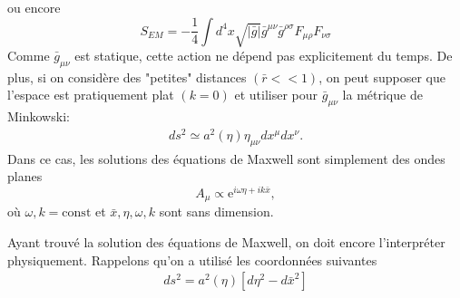\documentclass[a4paper,12pt]{report}
\theoremstyle{plain}
\theoremstyle{plain}
\begin{document}
   ou encore 
   \begin{equation}
   S_{EM} = - \frac{1}{4} \displaystyle \int d^4x \sqrt{|\bar{g}|} \bar{g}^{\mu \nu } \bar{g}^{\rho \sigma } F_{\mu \rho } F_{\nu \sigma } 
   \end{equation}
   Comme $\bar{g}_{\mu \nu }$ est statique, cette action ne d\'epend pas explicitement du temps. De plus, si on consid\`ere des "petites" distances $(\bar{r}<<1)$, on peut supposer que l'espace est pratiquement plat $(k=0)$ et utiliser pour $\bar{g}_{\mu \nu }$ la m\'etrique de Minkowski: 
   \begin{eqnarray}
   ds^2 \simeq a^2 ( \eta) \eta_{\mu \nu } dx^\mu dx^\nu.
   \end{eqnarray}
   Dans ce cas, les solutions des \'equations de Maxwell sont simplement des ondes planes 
   \begin{equation}
   A_\mu \propto \mathrm{e}^{i \omega \eta +ik \bar{x}},
   \end{equation} 
   o\`{u} $\omega , k = \text{const} $ et $ \bar{x}, \eta , \omega , k $ sont sans dimension. 
   
   Ayant trouv\'e la solution des \'equations de Maxwell, on doit encore l'interpr\'eter physiquement. Rappelons qu'on a utilis\'e les coordonn\'ees suivantes 
   \begin{eqnarray}
   ds^2 =a^2(\eta ) \left[ d \eta ^2 -d\bar{x}^2 \right]   
   \end{eqnarray}
   
\end{document}
